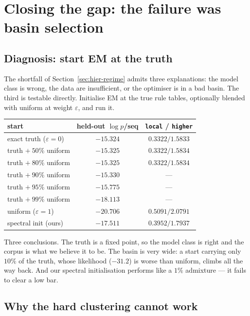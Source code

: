 \documentclass[11pt,a4paper]{article}
\theoremstyle{plain}
\theoremstyle{definition}
\begin{document}
\section{Closing the gap: the failure was basin selection}
\label{sec:hier-splitmerge}

\subsection{Diagnosis: start EM at the truth}

The shortfall of Section~\ref{sec:hier-regime} admits three explanations: the
model class is wrong, the data are insufficient, or the optimiser is in a bad
basin. The third is testable directly. Initialise EM at the true rule tables,
optionally blended with uniform at weight $\varepsilon$, and run it.

\begin{center}
\begin{tabular}{lcc}
\toprule
start & held-out $\log p$/seq & \texttt{local} / \texttt{higher} \\
\midrule
exact truth ($\varepsilon=0$)          & $-15.324$ & $0.3322 / 1.5833$ \\
truth $+\ 50\%$ uniform                & $-15.325$ & $0.3322 / 1.5834$ \\
truth $+\ 80\%$ uniform                & $-15.325$ & $0.3322 / 1.5834$ \\
truth $+\ 90\%$ uniform                & $-15.330$ & --- \\
truth $+\ 95\%$ uniform                & $-15.775$ & --- \\
truth $+\ 99\%$ uniform                & $-18.113$ & --- \\
uniform ($\varepsilon=1$)              & $-20.706$ & $0.5091 / 2.0791$ \\
\midrule
spectral init (ours)                   & $-17.511$ & $0.3952 / 1.7937$ \\
\bottomrule
\end{tabular}
\end{center}

\noindent
Three conclusions. The truth is a fixed point, so the model class is right and
the corpus is what we believe it to be. The basin is very wide: a start
carrying only $10\%$ of the truth, whose likelihood ($-31.2$) is worse than
uniform, climbs all the way back. And our spectral initialisation performs like
a $1\%$ admixture --- it fails to clear a low bar.

\subsection{Why the hard clustering cannot work}
\end{document}
